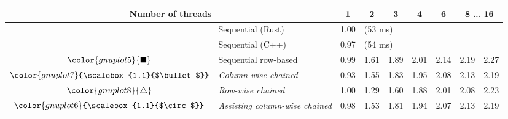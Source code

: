 \begin{tabular}{clrrrrrrr}
\toprule
\multicolumn{2}{c}{\textbf{Number of threads}} & \multicolumn{1}{c}{\textbf{ 1 }} & \multicolumn{1}{c}{\textbf{ 2 }} & \multicolumn{1}{c}{\textbf{ 3 }} & \multicolumn{1}{c}{\textbf{ 4 }} & \multicolumn{1}{c}{\textbf{ 6 }} & \multicolumn{2}{c}{\textbf{ 8 } \dots \textbf{ 16 }} \\
\midrule
& Sequential (Rust) & \multicolumn{1}{r}{ 1.00 } & \multicolumn{ 6 }{l}{(53 ms)} \\
& Sequential (C++) & \multicolumn{1}{r}{ 0.97 } & \multicolumn{ 6 }{l}{(54 ms)} \\
\rowcolor{gnuplot5!10}$\color{gnuplot5}{\blacksquare}$ & Sequential row-based & \cellcolor{gnuplot5!10} 0.99 & \cellcolor{gnuplot5!10} 1.61 & \cellcolor{gnuplot5!10} 1.89 & \cellcolor{gnuplot5!10} 2.01 & \cellcolor{gnuplot5!10} 2.14 & \cellcolor{gnuplot5!10} 2.19 & \cellcolor{gnuplot5!10} 2.27 \\
\rowcolor{gnuplot7!30}$\color{gnuplot7}{\scalebox{1.1}{$\bullet$}}$ & \textit{Column-wise chained} & \cellcolor{gnuplot7!30} 0.93 & \cellcolor{gnuplot7!30} 1.55 & \cellcolor{gnuplot7!30} 1.83 & \cellcolor{gnuplot7!30} 1.95 & \cellcolor{gnuplot7!30} 2.08 & \cellcolor{gnuplot7!30} 2.13 & \cellcolor{gnuplot7!30} 2.19 \\
\rowcolor{gnuplot8!30}$\color{gnuplot8}{\triangle}$ & \textit{Row-wise chained} & \cellcolor{gnuplot8!30} 1.00 & \cellcolor{gnuplot8!30} 1.29 & \cellcolor{gnuplot8!30} 1.60 & \cellcolor{gnuplot8!30} 1.88 & \cellcolor{gnuplot8!30} 2.01 & \cellcolor{gnuplot8!30} 2.08 & \cellcolor{gnuplot8!30} 2.23 \\
\rowcolor{gnuplot6!30}$\color{gnuplot6}{\scalebox{1.1}{$\circ$}}$ & \textit{Assisting column-wise chained} & \cellcolor{gnuplot6!30} 0.98 & \cellcolor{gnuplot6!30} 1.53 & \cellcolor{gnuplot6!30} 1.81 & \cellcolor{gnuplot6!30} 1.94 & \cellcolor{gnuplot6!30} 2.07 & \cellcolor{gnuplot6!30} 2.13 & \cellcolor{gnuplot6!30} 2.19 \\
\bottomrule
\end{tabular}
